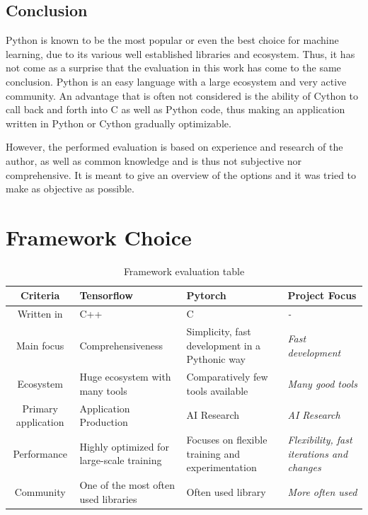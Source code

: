 \documentclass[12pt, a4paper, titlepage]{report}
\begin{document}
\subsection{Conclusion}

Python is known to be the most popular or even the best choice for machine learning, due to its various well established libraries and ecosystem. Thus, it has not come as a surprise that the evaluation in this work has come to the same conclusion. Python is an easy language with a large ecosystem and very active community. An advantage that is often not considered is the ability of Cython to call back and forth into C as well as Python code, thus making an application written in Python or Cython gradually optimizable.

However, the performed evaluation is based on experience and research of the author, as well as common knowledge and is thus not subjective nor comprehensive. It is meant to give an overview of the options and it was tried to make as objective as possible.



\section{Framework Choice}

\begin{table}
   \begin{tabular} {|c||p{4.0cm}|p{4.0cm}||p{3.0cm}|}
      \hline
      \textbf{Criteria}          & \textbf{Tensorflow} & \textbf{Pytorch} & \textbf{Project Focus} \\
      \hline
      Written in           & C++ & C & \emph{-} \\ \hline
      Main focus           & Comprehensiveness & Simplicity, fast development in a Pythonic way & \emph{Fast development} \\ \hline
      Ecosystem            & Huge ecosystem with many tools & Comparatively few tools available & \emph{Many good tools} \\ \hline
      Primary application  & Application Production & AI Research & \emph{AI Research} \\ \hline
      Performance          & Highly optimized for large-scale training & Focuses on flexible training and experimentation & \emph{Flexibility, fast iterations and changes} \\ \hline
      Community            & One of the most often used libraries & Often used library & \emph{More often used} \\ \hline
      \hline
   \end{tabular}
   \caption{Framework evaluation table}
   \label{table:framework_evaluation}
\end{table}
\end{document}
